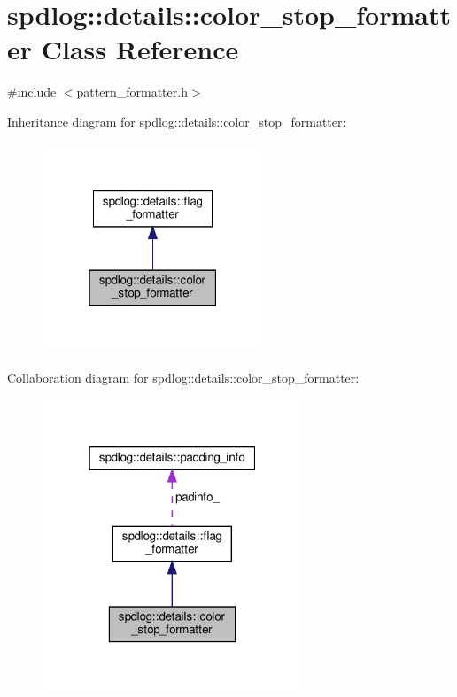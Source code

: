 \hypertarget{classspdlog_1_1details_1_1color__stop__formatter}{}\section{spdlog\+:\+:details\+:\+:color\+\_\+stop\+\_\+formatter Class Reference}
\label{classspdlog_1_1details_1_1color__stop__formatter}


{\ttfamily \#include $<$pattern\+\_\+formatter.\+h$>$}



Inheritance diagram for spdlog\+:\+:details\+:\+:color\+\_\+stop\+\_\+formatter\+:
\nopagebreak
\begin{figure}[H]
\begin{center}
\leavevmode
\includegraphics[width=187pt]{classspdlog_1_1details_1_1color__stop__formatter__inherit__graph}
\end{center}
\end{figure}


Collaboration diagram for spdlog\+:\+:details\+:\+:color\+\_\+stop\+\_\+formatter\+:
\nopagebreak
\begin{figure}[H]
\begin{center}
\leavevmode
\includegraphics[width=220pt]{classspdlog_1_1details_1_1color__stop__formatter__coll__graph}
\end{center}
\end{figure}
